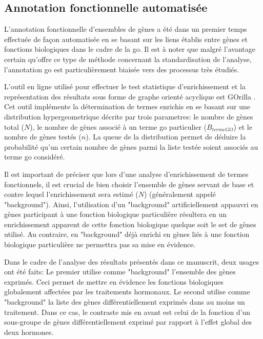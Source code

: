 \documentclass[../main.tex]{subfiles}
\begin{document}
\subsection{Annotation fonctionnelle automatisée}
L'annotation fonctionnelle d'ensembles de gènes a été dans un premier temps effectuée de façon automatisée en se basant sur les liens établis entre gènes et fonctions biologiques dans le cadre de la \gls{go}.
Il est à noter que malgré l'avantage certain qu'offre ce type de méthode concernant la standardisation de l'analyse, l'annotation \gls{go} est particulièrement biaisée vers des processus très étudiés.
\par
L'outil en ligne utilisé pour effectuer le test statistique d'enrichissement et la représentation des résultats sous forme de graphe orienté acyclique est GOrilla \citep{Eden2009}.
Cet outil implémente la détermination de termes enrichis en se basant sur une distribution hypergeometrique décrite par trois parametres:
le nombre de gènes total ($N$), le nombre de gènes associé à un terme \gls{go} particulier ($B_{terme GO}$) et le nombre de gènes testés ($n$).
La queue de la distribution permet de déduire la probabilité qu'un certain nombre de gènes parmi la liste testée soient associés au terme \gls{go} considéré.
\par
Il est important de préciser que lors d'une analyse d'enrichissement de termes fonctionnels, il est crucial de bien choisir l'ensemble de gènes servant de base et contre lequel l'enrichissement sera estimé ($N$) (généralement appelé "background").
Ainsi, l'utilisation d'un "background" artificiellement appauvri en gènes participant à une fonction biologique particulière résultera en un enrichissement apparent de cette fonction biologique quelque soit le set de gènes utilisé.
Au contraire, en "background" déjà enrichi en gènes liés à une fonction biologique particulière ne permettra pas sa mise en évidence.
\par
Dans le cadre de l'analyse des résultats présentés dans ce manuscrit, deux usages ont été faits:
Le premier utilise comme "background" l'ensemble des gènes exprimés.
Ceci permet de mettre en évidence les fonctions biologiques globalement affectées par les traitements hormonaux.
Le second utilise comme "background" la liste des gènes différentiellement exprimés dans au moins un traitement.
Dans ce cas, le contraste mis en avant est celui de la fonction d'un sous-groupe de gènes différentiellement exprimé par rapport à l'effet global des deux hormones.
\end{document}
